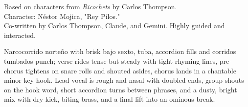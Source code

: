 

\begin{notes}
Based on characters from \emph{Ricochets} by Carlos Thompson.\\
Character: Néstor Mojica, "Rey Pilos."\\
Co-written by Carlos Thompson, Claude, and Gemini. %
Highly guided and interacted.
\end{notes}

\begin{style}
Narcocorrido norteño with brisk bajo sexto, tuba, accordion fills and corridos tumbados punch; verse rides tense but steady with tight rhyming lines, pre-chorus tightens on snare rolls and shouted asides, chorus lands in a chantable minor-key hook. %
Lead vocal is rough and nasal with doubled ends, group shouts on the hook word, short accordion turns between phrases, and a dusty, bright mix with dry kick, biting brass, and a final lift into an ominous break.
\end{style}

